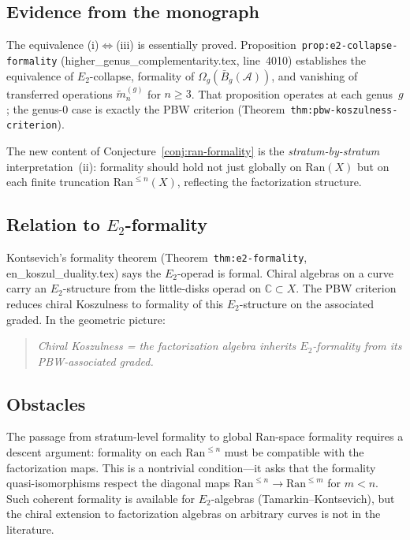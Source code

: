 \documentclass[11pt]{article}
\newcommand{\cA}{\mathcal{A}}
\newcommand{\bC}{\mathbb{C}}
\newcommand{\Ran}{\mathrm{Ran}}
\newcommand{\barB}{\bar{B}}
\newcommand{\Etwo}{E_2}
\theoremstyle{plain}
\theoremstyle{definition}
\theoremstyle{remark}
\begin{document}
\subsection{Evidence from the monograph}

The equivalence (i)$\Leftrightarrow$(iii) is essentially proved.
Proposition~\texttt{prop:e2-collapse-formality}
(higher\_genus\_complementarity.tex, line~4010) establishes the
equivalence of $E_2$-collapse, formality of
$\Omega_g(\barB_g(\cA))$, and vanishing of transferred operations
$\tilde{m}_n^{(g)}$ for $n \geq 3$.  That proposition operates at
each genus~$g$; the genus-$0$ case is exactly the PBW criterion
(Theorem~\texttt{thm:pbw-koszulness-criterion}).

The new content of Conjecture~\ref{conj:ran-formality} is the
\emph{stratum-by-stratum} interpretation~(ii): formality should
hold not just globally on $\Ran(X)$ but on each finite truncation
$\Ran^{\leq n}(X)$, reflecting the factorization structure.

\subsection{Relation to $\Etwo$-formality}

Kontsevich's formality theorem (Theorem~\texttt{thm:e2-formality},
en\_koszul\_duality.tex) says the $\Etwo$-operad is formal.
Chiral algebras on a curve carry an $\Etwo$-structure from the
little-disks operad on $\bC \subset X$.  The PBW criterion reduces
chiral Koszulness to formality of this $\Etwo$-structure on the
associated graded.  In the geometric picture:
\begin{quote}
\emph{Chiral Koszulness = the factorization algebra inherits
$\Etwo$-formality from its PBW-associated graded.}
\end{quote}

\subsection{Obstacles}

The passage from stratum-level formality to global Ran-space
formality requires a descent argument: formality on each
$\Ran^{\leq n}$ must be compatible with the factorization maps.
This is a nontrivial condition---it asks that the formality
quasi-isomorphisms respect the diagonal maps
$\Ran^{\leq n} \to \Ran^{\leq m}$ for $m < n$.  Such
coherent formality is available for $\Etwo$-algebras
(Tamarkin--Kontsevich), but the chiral extension to
factorization algebras on arbitrary curves is not in the
literature.
\end{document}

